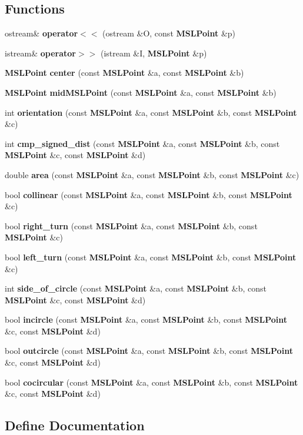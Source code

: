 \subsection*{Functions}
\begin{CompactItemize}
\item 
ostream\& {\bf operator$<$$<$} (ostream \&O, const {\bf MSLPoint} \&p)
\item 
istream\& {\bf operator$>$$>$} (istream \&I, {\bf MSLPoint} \&p)
\item 
{\bf MSLPoint} {\bf center} (const {\bf MSLPoint} \&a, const {\bf MSLPoint} \&b)
\item 
{\bf MSLPoint} {\bf mid\-MSLPoint} (const {\bf MSLPoint} \&a, const {\bf MSLPoint} \&b)
\item 
int {\bf orientation} (const {\bf MSLPoint} \&a, const {\bf MSLPoint} \&b, const {\bf MSLPoint} \&c)
\item 
int {\bf cmp\_\-signed\_\-dist} (const {\bf MSLPoint} \&a, const {\bf MSLPoint} \&b, const {\bf MSLPoint} \&c, const {\bf MSLPoint} \&d)
\item 
double {\bf area} (const {\bf MSLPoint} \&a, const {\bf MSLPoint} \&b, const {\bf MSLPoint} \&c)
\item 
bool {\bf collinear} (const {\bf MSLPoint} \&a, const {\bf MSLPoint} \&b, const {\bf MSLPoint} \&c)
\item 
bool {\bf right\_\-turn} (const {\bf MSLPoint} \&a, const {\bf MSLPoint} \&b, const {\bf MSLPoint} \&c)
\item 
bool {\bf left\_\-turn} (const {\bf MSLPoint} \&a, const {\bf MSLPoint} \&b, const {\bf MSLPoint} \&c)
\item 
int {\bf side\_\-of\_\-circle} (const {\bf MSLPoint} \&a, const {\bf MSLPoint} \&b, const {\bf MSLPoint} \&c, const {\bf MSLPoint} \&d)
\item 
bool {\bf incircle} (const {\bf MSLPoint} \&a, const {\bf MSLPoint} \&b, const {\bf MSLPoint} \&c, const {\bf MSLPoint} \&d)
\item 
bool {\bf outcircle} (const {\bf MSLPoint} \&a, const {\bf MSLPoint} \&b, const {\bf MSLPoint} \&c, const {\bf MSLPoint} \&d)
\item 
bool {\bf cocircular} (const {\bf MSLPoint} \&a, const {\bf MSLPoint} \&b, const {\bf MSLPoint} \&c, const {\bf MSLPoint} \&d)
\end{CompactItemize}


\subsection{Define Documentation}
